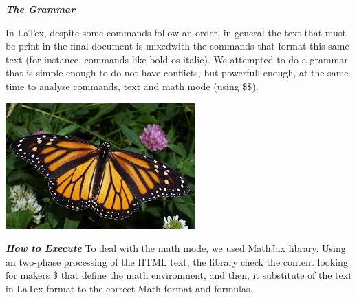 \documentclass{article}
\begin{document}
\textit{\textbf{The Grammar}}

In LaTex, despite some commands follow an order, in general the text that must be print in the final document is mixedwith the commands that format this same text (for instance, commands like bold os italic). We attempted to do a grammar that is simple enough to do not have conflicts, but powerfull enough, at the same time to analyse commands, text and math mode (using \$\$).

\includegraphics{monarch}

\textit{\textbf{How to Execute}}
To deal with the math mode, we used MathJax library. Using an two-phase processing of the HTML text, the library check the content looking for makers \$ that define the math environment, and then, it substitute of the text in LaTex format to the correct Math format and formulas.
\end{document}

